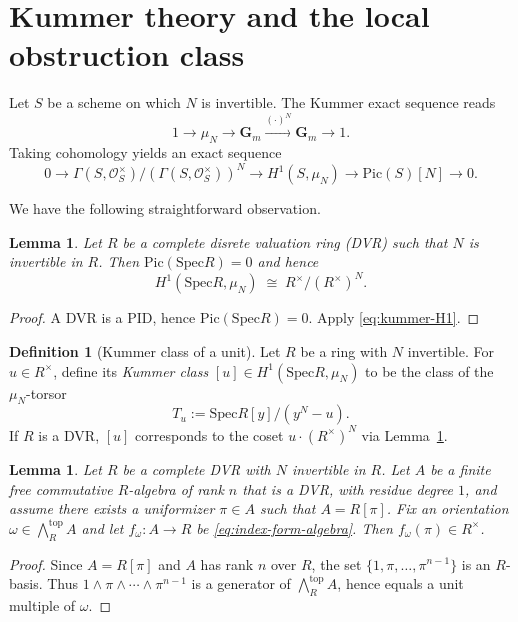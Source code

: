 \documentclass[11pt,letterpaper]{amsart}
\newcommand{\Gm}{\mathbf{G}_m}
\newcommand{\Spec}{\mathrm{Spec}}
\newcommand{\Pic}{\mathrm{Pic}}
\newcommand{\wedgeTop}{\bigwedge\nolimits^{\mathrm{top}}}
\newcommand{\OO}{\mathcal{O}}
\theoremstyle{plain}
\newtheorem{lemma}[theorem]{Lemma}
\theoremstyle{definition}
\newtheorem{definition}[theorem]{Definition}
\theoremstyle{remark}
\theoremstyle{plain}
\begin{document}
\section{Kummer theory and the local obstruction class}
\label{sec:kummer}

Let $S$ be a scheme on which $N$ is invertible. The Kummer exact sequence reads
\[
1\to \mu_N \to \Gm \xrightarrow{(\cdot)^N} \Gm \to 1.
\]
Taking cohomology yields an exact sequence
\begin{equation}\label{eq:kummer-H1}
0\to \Gamma(S,\OO_S^\times)/(\Gamma(S,\OO_S^\times))^N \longrightarrow H^1(S,\mu_N)
\longrightarrow \Pic(S)[N]\to 0.
\end{equation}

We have the following straightforward observation.

\begin{lemma}\label{lem:H1-DVR}
Let $R$ be a complete disrete valuation ring (DVR) such that $N$ is invertible in $R$.
Then $\Pic(\Spec R)=0$ and hence
\[
H^1(\Spec R,\mu_N) \;\cong\; R^\times/(R^\times)^N.
\]
\end{lemma}

\begin{proof}
A DVR is a PID, hence $\Pic(\Spec R)=0$. Apply \eqref{eq:kummer-H1}.
\end{proof}


\begin{definition}[Kummer class of a unit]\label{def:kummerclass}
Let $R$ be a ring with $N$ invertible.
For $u\in R^\times$, define its \emph{Kummer class} $[u]\in H^1(\Spec R,\mu_N)$ to be the class of the
$\mu_N$-torsor
\[
T_u := \Spec R[y]/(y^N-u).
\]
If $R$ is a DVR, $[u]$ corresponds to the coset $u\cdot (R^\times)^N$ via Lemma~\ref{lem:H1-DVR}.
\end{definition}

\begin{lemma}\label{lem:unitvalue}
Let $R$ be a complete DVR with $N$ invertible in $R$.
Let $A$ be a finite free commutative $R$-algebra of rank $n$ that is a DVR,
with residue degree $1$, and assume there exists a uniformizer $\pi\in A$ such that $A=R[\pi]$.
Fix an orientation $\omega\in \wedgeTop_R A$ and let $f_\omega:A\to R$ be \eqref{eq:index-form-algebra}. Then $f_\omega(\pi)\in R^\times$.
\end{lemma}

\begin{proof}
Since $A=R[\pi]$ and $A$ has rank $n$ over $R$, the set $\{1,\pi,\dots,\pi^{n-1}\}$ is an $R$-basis.
Thus $1\wedge\pi\wedge\cdots\wedge\pi^{n-1}$ is a generator of $\wedgeTop_R A$, hence equals a unit multiple of $\omega$.
\end{proof}
\end{document}
